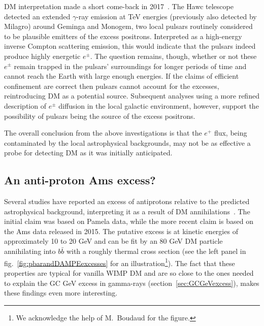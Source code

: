 DM interpretation made a short come-back in 2017~\cite{HAWCanomaly}. The {\sc Hawc} telescope detected an extended  $\gamma$-ray emission at TeV energies (previously also detected by {\sc Milagro}) around Geminga and Monogem, two local pulsars routinely considered to be plausible emitters of the excess positrons. Interpreted as a high-energy inverse Compton scattering emission, this would indicate that the pulsars indeed produce highly energetic $e^\pm$. The question remains, though, whether or not these $e^\pm$ remain trapped  in the pulsars' surroundings for longer periods of time and cannot reach the Earth with large enough energies. 
If the claims of  efficient confinement are correct then pulsars cannot account for the excesses, reintroducing DM as a potential source.
Subsequent analyses
using a more refined description of $e^\pm$ diffusion in the local galactic environment, however, support the possibility of pulsars being the source of the excess positrons. 


\medskip

The overall conclusion from the above investigations is that the $e^+$ flux, being contaminated by the local astrophysical backgrounds,
may not be as effective a probe for detecting DM as it was initially anticipated.




\subsection{An anti-proton {\sc Ams} excess?}
\label{sec:pbarexcess}
Several studies have reported an excess of antiprotons relative to the predicted astrophysical background, interpreting it as a result of DM annihilations~\cite{pbarexcess}. 
The initial claim was based on {\sc Pamela} data, while the more recent claim is based on the {\sc Ams} data released in 2015. 
The putative excess is at kinetic energies of approximately 10 to 20 GeV and can be fit by an 80 GeV DM particle annihilating into $b \bar b$ with a roughly thermal cross section (see the left panel in fig.~\ref{fig:pbarandDAMPEexcesses} for an illustration\footnote{We acknowledge the help of M.~Boudaud for the figure.}). 
The fact that these properties are typical for vanilla WIMP DM and are so close to the ones needed to explain the GC GeV excess in gamma-rays (section~\ref{sec:GCGeVexcess}), makes these findings even more interesting.

\medskip

